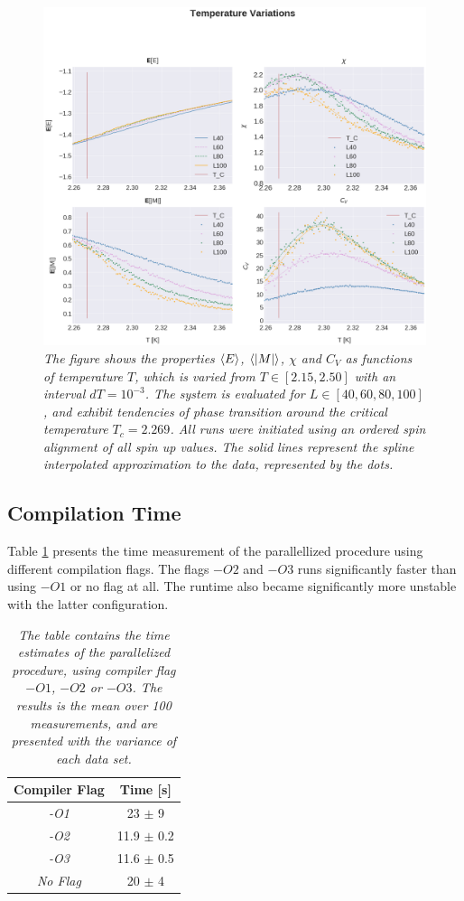 \documentclass[%
reprint,nofootinbib,
amsmath,amssymb,
aps,
]{revtex4-1}
\begin{document}
\begin{figure}[H]
	\centering 
	\includegraphics[scale = 0.39]{Figures/plot5.png} 
	\caption{ \label{4C5} \textit{ The figure shows the properties $\expval{E}$, $\expval{\abs{M}}$, $\chi$ and $C_V$ as functions of temperature $T$, which is varied from $T\in[2.15, 2.50]$ with an interval $dT = 10^{-3}$. The system is evaluated for $L \in[40,60,80,100]$, and exhibit tendencies of phase transition around the critical temperature $T_c = 2.269$. All runs were initiated using an ordered spin alignment of all spin up values. The solid lines represent the spline interpolated approximation to the data, represented by the dots. }}
\end{figure} 
\newpage 

\twocolumngrid 


\subsection*{Compilation Time} \noindent 
Table \ref{Compilationtime} presents the time measurement of the parallellized procedure using different compilation flags. The flags $-O2$ and $-O3$ runs significantly faster than using $-O1$ or no flag at all. The runtime also became significantly more unstable with the latter configuration.  
\begin{table}[!h]
	\caption{\textit{The table contains the time estimates of the parallelized procedure, using compiler flag $-O1$, $-O2$ or $-O3$. The results is the mean over 100 measurements, and are presented with the variance of each data set. } \label{Compilationtime}}
	\begin{tabular}{|c|c|} \hline
		\textbf{Compiler Flag}  & \textbf{Time [s]}   \\ \hline
		\textit{-O1} & 23 $\pm$ 9 \\ 
		\textit{-O2} & 11.9 $\pm$ 0.2\\ 
		\textit{-O3} & 11.6 $\pm$ 0.5 \\ 
		\textit{No Flag} &  20 $\pm$ 4\\ \hline 
	\end{tabular}
\end{table}
\end{document}
